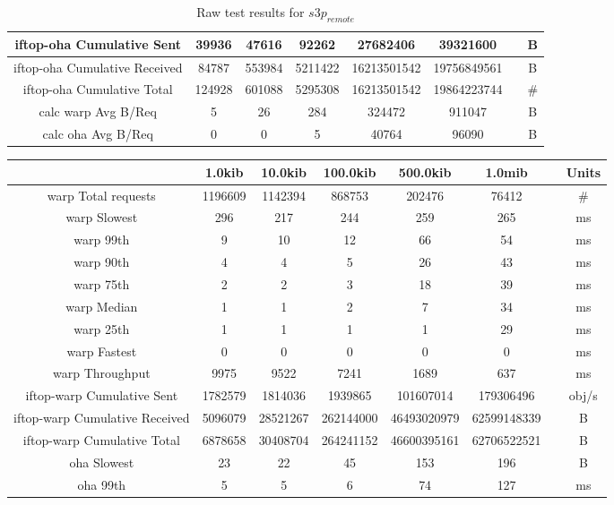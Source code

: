 \begin{sidewaystable}
\begin{tabular}{|c|c|c|c|c|c|c|c|}
		\hline
		iftop-oha Cumulative Sent & 39936 & 47616 & 92262 & 27682406 & 39321600 &  & B \\
		\hline
		iftop-oha Cumulative Received & 84787 & 553984 & 5211422 & 16213501542 & 19756849561 &  & B \\
		\hline
		iftop-oha Cumulative Total & 124928 & 601088 & 5295308 & 16213501542 & 19864223744 &  & \# \\
		\hline
		calc warp Avg B/Req & 5 & 26 & 284 & 324472 & 911047 &  & B \\
		\hline
		calc oha Avg B/Req & 0 & 0 & 5 & 40764 & 96090 &  & B \\
		\hline
	\end{tabular}
	\caption{Raw test results for ${s3p}_{remote}$}
\end{sidewaystable}

\begin{sidewaystable}
	\begin{tabular}{|c|c|c|c|c|c|c|c|}
		\hline
		& 1.0kib & 10.0kib & 100.0kib & 500.0kib & 1.0mib &  & Units \\
		\hline
		warp Total requests & 1196609 & 1142394 & 868753 & 202476 & 76412 &  & \# \\
		\hline
		warp Slowest & 296 & 217 & 244 & 259 & 265 &  & ms \\
		\hline
		warp 99th & 9 & 10 & 12 & 66 & 54 &  & ms \\
		\hline
		warp 90th & 4 & 4 & 5 & 26 & 43 &  & ms \\
		\hline
		warp 75th & 2 & 2 & 3 & 18 & 39 &  & ms \\
		\hline
		warp Median & 1 & 1 & 2 & 7 & 34 &  & ms \\
		\hline
		warp 25th & 1 & 1 & 1 & 1 & 29 &  & ms \\
		\hline
		warp Fastest & 0 & 0 & 0 & 0 & 0 &  & ms \\
		\hline
		warp Throughput & 9975 & 9522 & 7241 & 1689 & 637 &  & ms \\
		\hline
		iftop-warp Cumulative Sent & 1782579 & 1814036 & 1939865 & 101607014 & 179306496 &  & obj/s \\
		\hline
		iftop-warp Cumulative Received & 5096079 & 28521267 & 262144000 & 46493020979 & 62599148339 &  & B \\
		\hline
		iftop-warp Cumulative Total & 6878658 & 30408704 & 264241152 & 46600395161 & 62706522521 &  & B \\
		\hline
		oha Slowest & 23 & 22 & 45 & 153 & 196 &  & B \\
		\hline
		oha 99th & 5 & 5 & 6 & 74 & 127 &  & ms \\

\end{tabular}
\end{sidewaystable}
